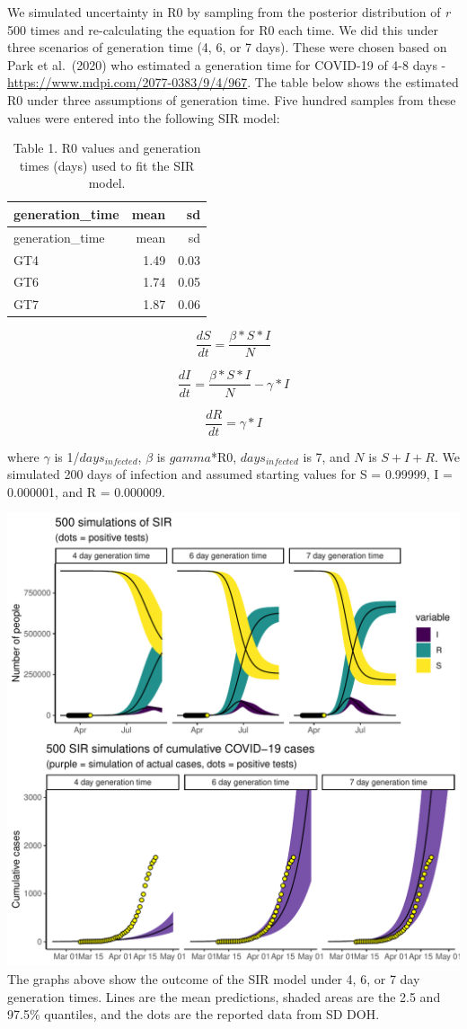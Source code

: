 \documentclass[
]{article}
\begin{document}
We simulated uncertainty in R0 by sampling from the posterior
distribution of \emph{r} 500 times and re-calculating the equation for
R0 each time. We did this under three scenarios of generation time (4,
6, or 7 days). These were chosen based on Park et al.~(2020) who
estimated a generation time for COVID-19 of 4-8 days -
\url{https://www.mdpi.com/2077-0383/9/4/967}. The table below shows the
estimated R0 under three assumptions of generation time. Five hundred
samples from these values were entered into the following SIR model:

\begin{longtable}[]{@{}lrr@{}}
\caption{Table 1. R0 values and generation times (days) used to fit the
SIR model.}\tabularnewline
\toprule
generation\_time & mean & sd\tabularnewline
\midrule
\endfirsthead
\toprule
generation\_time & mean & sd\tabularnewline
\midrule
\endhead
GT4 & 1.49 & 0.03\tabularnewline
GT6 & 1.74 & 0.05\tabularnewline
GT7 & 1.87 & 0.06\tabularnewline
\bottomrule
\end{longtable}

\[\frac{dS}{dt} = \frac{\beta*S*I}N\]

\[\frac{dI}{dt} = \frac{\beta*S*I}N - \gamma*I\]

\[\frac{dR}{dt} = \gamma*I\]

where \(\gamma\) is 1/\(days_{infected}\), \(\beta\) is \(gamma\)*R0,
\(days_{infected}\) is 7, and \(N\) is \(S+I+R\). We simulated 200 days
of infection and assumed starting values for S = 0.99999, I = 0.000001,
and R = 0.000009.

\includegraphics{script_SIR_sims_publish_files/figure-latex/unnamed-chunk-7-1.pdf}
The graphs above show the outcome of the SIR model under 4, 6, or 7 day
generation times. Lines are the mean predictions, shaded areas are the
2.5 and 97.5\% quantiles, and the dots are the reported data from SD
DOH.
\end{document}
